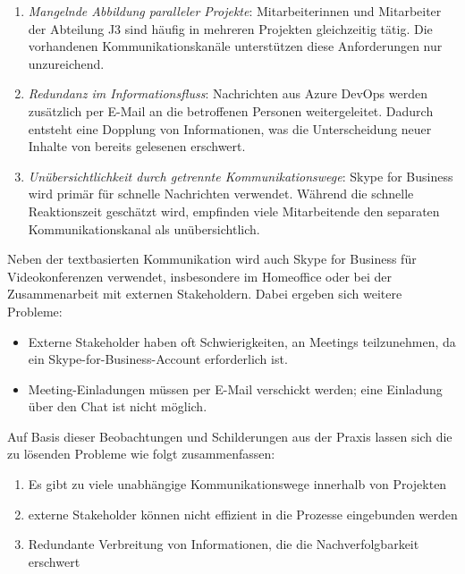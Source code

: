 \documentclass[ThesisDJ.tex]{subfiles}
\begin{document}
  \begin{enumerate}
    \item \emph{Mangelnde Abbildung paralleler Projekte}: Mitarbeiterinnen und Mitarbeiter der Abteilung J3 sind häufig in mehreren Projekten gleichzeitig tätig. Die vorhandenen Kommunikationskanäle unterstützen diese Anforderungen nur unzureichend.
    \item \emph{Redundanz im Informationsfluss}: Nachrichten aus Azure DevOps werden zusätzlich per E-Mail an die betroffenen Personen weitergeleitet. Dadurch entsteht eine Dopplung von Informationen, was die Unterscheidung neuer Inhalte von bereits gelesenen erschwert.
    \item \emph{Unübersichtlichkeit durch getrennte Kommunikationswege}: Skype for Business wird primär für schnelle Nachrichten verwendet. Während die schnelle Reaktionszeit geschätzt wird, empfinden viele Mitarbeitende den separaten Kommunikationskanal als unübersichtlich.
  \end{enumerate}

  Neben der textbasierten Kommunikation wird auch Skype for Business für Videokonferenzen verwendet, insbesondere im Homeoffice oder bei 
  der Zusammenarbeit mit externen Stakeholdern. Dabei ergeben sich weitere Probleme:

  \begin{itemize}
    \item Externe Stakeholder haben oft Schwierigkeiten, an Meetings teilzunehmen, da ein Skype-for-Business-Account erforderlich ist.
    \item Meeting-Einladungen müssen per E-Mail verschickt werden; eine Einladung über den Chat ist nicht möglich.
  \end{itemize}

  Auf Basis dieser Beobachtungen und Schilderungen aus der Praxis lassen sich die zu lösenden Probleme wie folgt zusammenfassen:

  \begin{enumerate}
    \item Es gibt zu viele unabhängige Kommunikationswege innerhalb von Projekten
    \item externe Stakeholder können nicht effizient in die Prozesse eingebunden werden 
    \item Redundante Verbreitung von Informationen, die die Nachverfolgbarkeit erschwert
  \end{enumerate}
\end{document}
